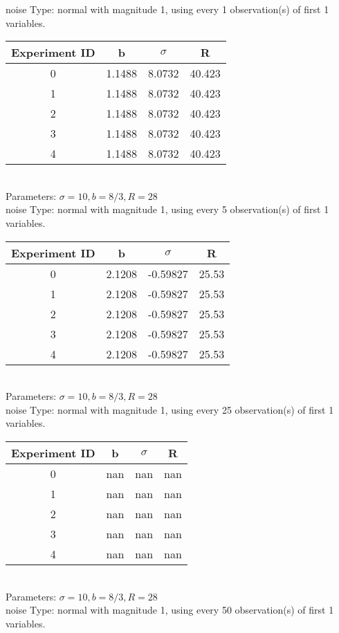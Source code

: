 \begin{multicols}{3}
noise Type: normal with magnitude 1, using every 1 observation(s) of first 1 variables.\\
\begin{tabular}{cccc}
\hline Experiment ID & b & $\sigma$ & R \\ \hline 
0 & 1.1488 & 8.0732 & 40.423\\ \hline 
 1 & 1.1488 & 8.0732 & 40.423\\ \hline 
 2 & 1.1488 & 8.0732 & 40.423\\ \hline 
 3 & 1.1488 & 8.0732 & 40.423\\ \hline 
 4 & 1.1488 & 8.0732 & 40.423\\ \hline 
 \end{tabular}\\
Parameters: $\sigma=10, b=8/3, R=28$\\
noise Type: normal with magnitude 1, using every 5 observation(s) of first 1 variables.\\
\begin{tabular}{cccc}
\hline Experiment ID & b & $\sigma$ & R \\ \hline 
0 & 2.1208 & -0.59827 & 25.53\\ \hline 
 1 & 2.1208 & -0.59827 & 25.53\\ \hline 
 2 & 2.1208 & -0.59827 & 25.53\\ \hline 
 3 & 2.1208 & -0.59827 & 25.53\\ \hline 
 4 & 2.1208 & -0.59827 & 25.53\\ \hline 
 \end{tabular}\\
Parameters: $\sigma=10, b=8/3, R=28$\\
noise Type: normal with magnitude 1, using every 25 observation(s) of first 1 variables.\\
\begin{tabular}{cccc}
\hline Experiment ID & b & $\sigma$ & R \\ \hline 
0 & nan & nan & nan\\ \hline 
 1 & nan & nan & nan\\ \hline 
 2 & nan & nan & nan\\ \hline 
 3 & nan & nan & nan\\ \hline 
 4 & nan & nan & nan\\ \hline 
 \end{tabular}\\
Parameters: $\sigma=10, b=8/3, R=28$\\
noise Type: normal with magnitude 1, using every 50 observation(s) of first 1 variables.\\

\end{multicols}
